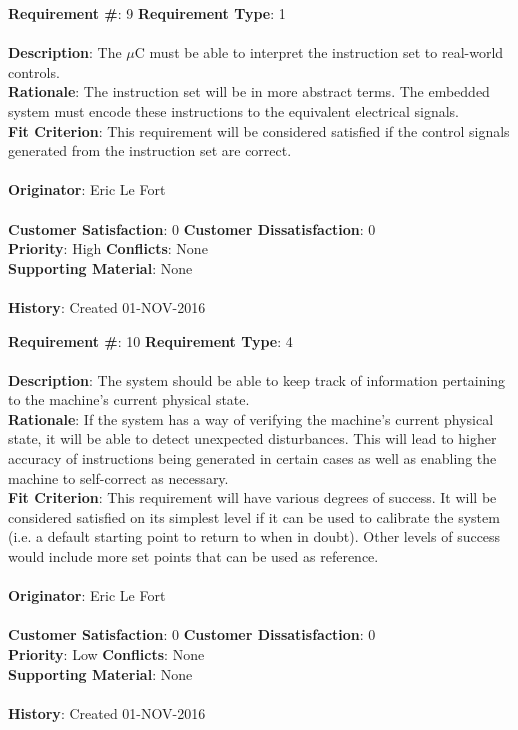 \documentclass[titlepage]{article}
\begin{document}
\begin{framed}
	\noindent\textbf{Requirement \#}: 9 \hfill \textbf{Requirement Type}: 1 \hfill\\\\
	\noindent\textbf{Description}: The $\mu$C must be able to interpret the instruction set to real-world controls.\\
	\textbf{Rationale}: The instruction set will be in more abstract terms.  The embedded system must encode these instructions to the equivalent electrical signals.\\
	\textbf{Fit Criterion}: This requirement will be considered satisfied if the control signals generated from the instruction set are correct.\\\\
	\textbf{Originator}: Eric Le Fort\\\\
	\noindent\textbf{Customer Satisfaction}: 0 \hfill 	\textbf{Customer Dissatisfaction}: 0 \hfill\\
	\textbf{Priority}: High \hfill \textbf{Conflicts}: None \hfill\\
	\textbf{Supporting Material}: None\\\\
	\noindent\textbf{History}: Created 01-NOV-2016
\end{framed}

\begin{framed}
	\noindent\textbf{Requirement \#}: 10 \hfill \textbf{Requirement Type}: 4 \hfill\\\\
	\noindent\textbf{Description}: The system should be able to keep track of information pertaining to the machine's current physical state.\\
	\textbf{Rationale}: If the system has a way of verifying the machine's current physical state, it will be able to detect unexpected disturbances. This will lead to higher accuracy of instructions being generated in certain cases as well as enabling the machine to self-correct as necessary.\\
	\textbf{Fit Criterion}: This requirement will have various degrees of success. It will be considered satisfied on its simplest level if it can be used to calibrate the system (i.e. a default starting point to return to when in doubt). Other levels of success would include more set points that can be used as reference.\\\\
	\textbf{Originator}: Eric Le Fort\\\\
	\noindent\textbf{Customer Satisfaction}: 0 \hfill 	\textbf{Customer Dissatisfaction}: 0 \hfill\\
	\textbf{Priority}: Low \hfill \textbf{Conflicts}: None \hfill\\
	\textbf{Supporting Material}: None\\\\
	\noindent\textbf{History}: Created 01-NOV-2016
\end{framed}
\end{document}
